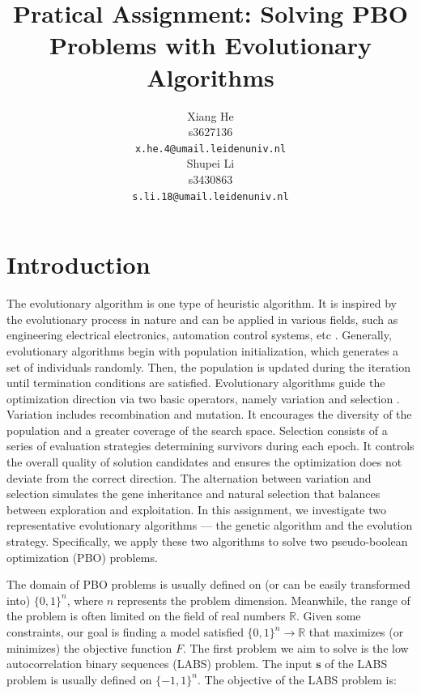 \documentclass{article}
\title{Pratical Assignment: Solving PBO Problems with Evolutionary Algorithms}
\author{
 Xiang He\\
  s3627136\\
  \texttt{x.he.4@umail.leidenuniv.nl}\\
   \And
 Shupei Li\\
  s3430863\\
  \texttt{s.li.18@umail.leidenuniv.nl} \\
}
\begin{document}
\maketitle




\section{Introduction}\label{sec:intro}
The evolutionary algorithm is one type of heuristic algorithm. It is inspired by the evolutionary process in nature and can be applied in various fields, such as engineering electrical electronics, automation control systems, etc \cite{2020slowik}. Generally, evolutionary algorithms begin with population initialization, which generates a set of individuals randomly. Then, the population is updated during the iteration until termination conditions are satisfied. Evolutionary algorithms guide the optimization direction via two basic operators, namely variation and selection \cite{2016eiben}. Variation includes recombination and mutation. It encourages the diversity of the population and a greater coverage of the search space. Selection consists of a series of evaluation strategies determining survivors during each epoch. It controls the overall quality of solution candidates and ensures the optimization does not deviate from the correct direction. The alternation between variation and selection simulates the gene inheritance and natural selection that balances between exploration and exploitation. In this assignment, we investigate two representative evolutionary algorithms --- the genetic algorithm and the evolution strategy. Specifically, we apply these two algorithms to solve two pseudo-boolean optimization (PBO) problems.

The domain of PBO problems is usually defined on (or can be easily transformed into) $\{0, 1\}^n$, where $n$ represents the problem dimension. Meanwhile, the range of the problem is often limited on the field of real numbers $\mathbb{R}$. Given some constraints, our goal is finding a model satisfied $\{0, 1\}^n\rightarrow \mathbb{R}$ that maximizes (or minimizes) the objective function $F$. The first problem we aim to solve is the low autocorrelation binary sequences (LABS) problem. The input $\mathbf{s}$ of the LABS problem is usually defined on $\{-1, 1\}^n$. The objective of the LABS problem is:
\end{document}
